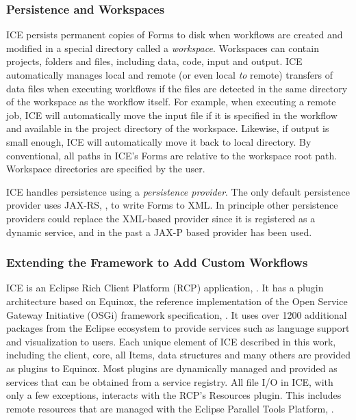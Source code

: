 \subsubsection{Persistence and
Workspaces}\label{persistence-and-workspaces}

ICE persists permanent copies of Forms to disk when workflows are
created and modified in a special directory called a \emph{workspace}.
Workspaces can contain projects, folders and files, including data,
code, input and output. ICE automatically manages local and remote (or
even local \emph{to} remote) transfers of data files when executing
workflows if the files are detected in the same directory of the
workspace as the workflow itself. For example, when executing a remote
job, ICE will automatically move the input file if it is specified in
the workflow and available in the project directory of the workspace.
Likewise, if output is small enough, ICE will automatically move it back
to local directory. By conventional, all paths in ICE's Forms are
relative to the workspace root path. Workspace directories are specified
by the user.

ICE handles persistence using a \emph{persistence provider}. The only
default persistence provider uses JAX-RS, \cite{burke_restful_2010}, to write
Forms to XML. In principle other persistence providers could replace the
XML-based provider since it is registered as a dynamic service, and in
the past a JAX-P based provider has been used.

\subsubsection{Extending the Framework to Add Custom
Workflows}\label{extending-the-framework-to-add-custom-workflows}

ICE is an Eclipse Rich Client Platform (RCP) application,
\cite{mcaffer_eclipse_2010}. It has a plugin architecture based on Equinox, the
reference implementation of the Open Service Gateway Initiative (OSGi) framework specification, \cite{mcaffer_osgi_2010}. It uses over 1200 additional
packages from the Eclipse ecosystem to provide services such as language
support and visualization to users. Each unique element of ICE described
in this work, including the client, core, all Items, data structures and
many others are provided as plugins to Equinox. Most plugins are
dynamically managed and provided as services that can be obtained from a
service registry. All file I/O in ICE, with only a few exceptions,
interacts with the RCP's Resources plugin. This includes remote
resources that are managed with the Eclipse Parallel Tools Platform,
\cite{tibbitts_integrated_2009}.

